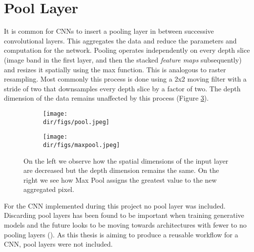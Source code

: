 \section{Pool Layer}
It is common for CNNs to insert a pooling layer in between successive convolutional layers. This aggregates the data and reduce the parameters and computation for the network. Pooling operates independently on every depth slice (image band in the first layer, and then the stacked \textit{feature maps} subsequently) and resizes it spatially using the max function. This is analogous to raster resampling. Most commonly this process is done using a 2x2 moving filter with a stride of two that downsamples every depth slice by a factor of two. The depth dimension of the data remains unaffected by this process (Figure \ref{fig.pooling}).
\begin{figure}[htbp]
\centering
\begin{subfigure}{0.45\textwidth}
\texttt{[image: \\dir/figs/pool.jpeg]}
\caption{}
\label{fig.pool}
\end{subfigure}%
\qquad
\begin{subfigure}{0.45\textwidth}
\texttt{[image: \\dir/figs/maxpool.jpeg]}
\caption{}
\label{fig.maxpool}
\end{subfigure}
\caption[Example of pooling and Max Pool function]{On the left we observe how the spatial dimensions of the input layer are decreased but the depth dimension remains the same. On the right we see how Max Pool assigns the greatest value to the new aggregated pixel.}
\label{fig.pooling}
\end{figure}
\par
For the CNN implemented during this project no pool layer was included. Discarding pool layers has been found to be important when training generative models and the future looks to be moving towards architectures with fewer to no pooling layers (\cite{Springenberg14}). As this thesis is aiming to produce a reusable workflow for a CNN, pool layers were not included. 

